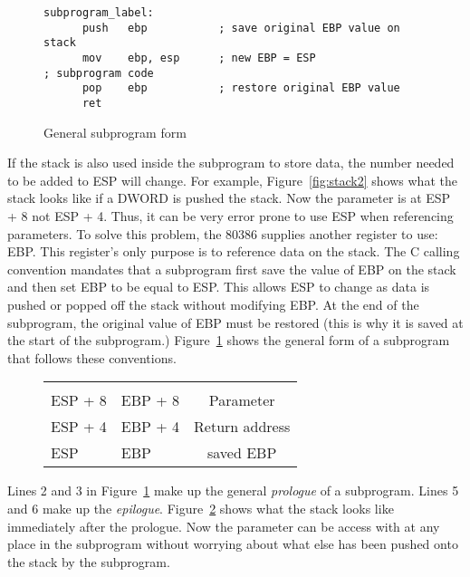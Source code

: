 \begin{figure}[t]
 \begin{lstlisting}[language={[x86masm]Assembler}]
subprogram_label:
      push   ebp           ; save original EBP value on stack
      mov    ebp, esp      ; new EBP = ESP
; subprogram code
      pop    ebp           ; restore original EBP value
      ret
\end{lstlisting}
\caption{General subprogram form \label{fig:subskel1}}
\end{figure}

If the stack is also used inside the subprogram to store data, the
number needed to be added to ESP will change. For example,
Figure~\ref{fig:stack2} shows what the stack looks like if a DWORD is
pushed the stack. Now the parameter is at {\code ESP + 8} not {\code
ESP + 4}. Thus, it can be very error prone to use ESP when referencing
parameters. To solve this problem, the 80386 supplies another register
to use: EBP. This register's only purpose is to reference data on the
stack. The C calling convention mandates that a subprogram first save
the value of EBP on the stack and then set EBP to be equal to ESP.
This allows ESP to change as data is pushed or popped off the stack
without modifying EBP. At the end of the subprogram, the original
value of EBP must be restored (this is why it is saved at the start of
the subprogram.)  Figure~\ref{fig:subskel1} shows the general form of
a subprogram that follows these conventions.

\begin{figure}[t]
\centering
\begin{tabular}{ll|c|}
\cline{3-3}
&  & \\ \cline{3-3}
ESP + 8 & EBP + 8 & Parameter \\ \cline{3-3}
ESP + 4 & EBP + 4 & Return address \\ \cline{3-3}
ESP     & EBP     & saved EBP \\ \cline{3-3}
\end{tabular}
\caption{}
\label{fig:stack3}
\end{figure}


Lines 2 and 3 in Figure~\ref{fig:subskel1} make up the general \emph{prologue}
of a subprogram. Lines 5 and 6 make up the \emph{epilogue}. 
Figure~\ref{fig:stack3} shows what the stack looks like immediately
after the prologue. Now the parameter can be access with {\code [EBP + 8]}
at any place in the subprogram without worrying about what else has
been pushed onto the stack by the subprogram.

